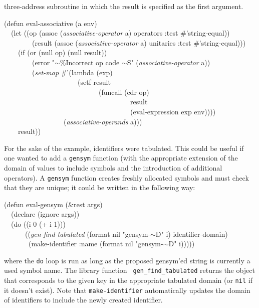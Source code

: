 three-address subroutine in which the result is specified as the first
argument. 
\begin{pgm}
(defun eval-associative (a env) \\
~~(let ((op (assoc ({\sl associative-operator} a) operators 
				:test \#'string-equal)) \\
~~~~~~~~(result (assoc ({\sl associative-operator} a) unitaries 
				:test \#'string-equal))) \\ 
~~~~(if (or (null op) (null result)) \\
~~~~~~~~(error "$\sim$\%Incorrect op code $\sim$S" ({\sl associative-operator} a)) \\
~~~~~~~~({\sl set-map} \#'(lambda (exp) \\
~~~~~~~~~~~~~~~~~~~~~(setf result  \\
~~~~~~~~~~~~~~~~~~~~~~~~~~~(funcall (cdr op) \\
~~~~~~~~~~~~~~~~~~~~~~~~~~~~~~~~~~~~result  \\
~~~~~~~~~~~~~~~~~~~~~~~~~~~~~~~~~~~~(eval-expression exp env)))) \\
~~~~~~~~~~~~~~~~~({\sl associative-operands} a))) \\
~~~~result)) \\
\end{pgm}
For the sake of the example, identifiers were tabulated. This could be
useful if one wanted to add a {\tt gensym} function (with the
appropriate extension of the domain of values to include symbols and the
introduction of additional operators). A {\tt gensym} function creates
freshly allocated symbols and must check that they are unique; it could
be written in the following way:
\begin{pgm}
(defun eval-gensym (\&rest args) \\
~~(declare (ignore args)) \\
~~(do ((i 0 (+ i 1))) \\
~~~~~~(({\sl gen-find-tabulated} (format nil "gensym-$\sim$D" i)
				 identifier-domain)\\
~~~~~~~(make-identifier :name  (format nil "gensym-$\sim$D" i)))))
\end{pgm}
where the {\tt do} loop is run as long as the proposed gensym'ed string
is currently a used symbol name. The library function {\tt
gen\_find\_tabulated} returns the object that corresponds to the given
key in the appropriate tabulated domain (or {\tt nil} if it doesn't
exist). Note that {\tt make-identifier} automatically updates the domain
of identifiers to include the newly created identifier.

